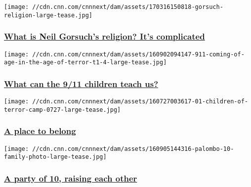 \href{/2017/03/18/politics/neil-gorsuch-religion/index.html}{}

\texttt{[image: //cdn.cnn.com/cnnnext/dam/assets/170316150818-gorsuch-religion-large-tease.jpg]}

\hypertarget{what-is-neil-gorsuchs-religion-its-complicated-}{%
\subsubsection{\texorpdfstring{\href{/2017/03/18/politics/neil-gorsuch-religion/index.html}{What
is Neil Gorsuch's religion? It's complicated
}}{What is Neil Gorsuch's religion? It's complicated }}\label{what-is-neil-gorsuchs-religion-its-complicated-}}

\href{http://www.cnn.com/interactive/2016/09/us/911-children-age-of-terror/index.html}{}

\texttt{[image: //cdn.cnn.com/cnnnext/dam/assets/160902094147-911-coming-of-age-in-the-age-of-terror-t1-4-large-tease.jpg]}

\hypertarget{what-can-the-911-children-teach-us}{%
\subsubsection{\texorpdfstring{\href{http://www.cnn.com/interactive/2016/09/us/911-children-age-of-terror/index.html}{What
can the 9/11 children teach
us?}}{What can the 9/11 children teach us?}}\label{what-can-the-911-children-teach-us}}

\href{/2016/09/06/world/children-of-terror-camp/index.html}{}

\texttt{[image: //cdn.cnn.com/cnnnext/dam/assets/160727003617-01-children-of-terror-camp-0727-large-tease.jpg]}

\hypertarget{a-place-to-belong}{%
\subsubsection{\texorpdfstring{\href{/2016/09/06/world/children-of-terror-camp/index.html}{A
place to belong}}{A place to belong}}\label{a-place-to-belong}}

\href{/2016/09/06/us/palombo-10-siblings-from-9-11/index.html}{}

\texttt{[image: //cdn.cnn.com/cnnnext/dam/assets/160905144316-palombo-10-family-photo-large-tease.jpg]}

\hypertarget{a-party-of-10-raising-each-other}{%
\subsubsection{\texorpdfstring{\href{/2016/09/06/us/palombo-10-siblings-from-9-11/index.html}{A
party of 10, raising each
other}}{A party of 10, raising each other}}\label{a-party-of-10-raising-each-other}}

